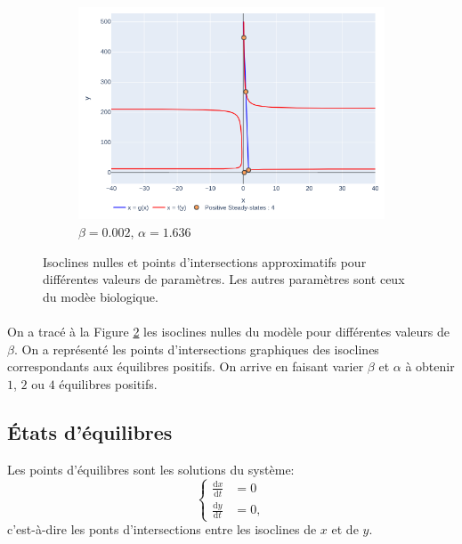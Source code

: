 \documentclass[12pt]{article}
\newcommand{\deriv}{\mathrm{d}}
\newcommand{\dt}[1]{\frac{\deriv #1}{\deriv t}}
\begin{document}
\begin{figure}[!ht]
\begin{subfigure}[b]{0.49\textwidth}
         \centering
         \includegraphics[width=\textwidth]{../figures/fig_isocline_0.png}
         \caption{$\beta = 0.002$, $\alpha=1.636$}
         \label{fig::nuclline 4 ss}
     \end{subfigure}
    \caption{Isoclines nulles et points d'intersections approximatifs pour différentes valeurs de paramètres. Les autres paramètres sont ceux du modèe biologique.}
    \label{fig:nullclines}
\end{figure}

\paragraph{}
On a tracé à la Figure \ref{fig:nullclines} les isoclines nulles du modèle pour différentes valeurs de $\beta$. On a représenté les points d'intersections graphiques des isoclines correspondants aux équilibres positifs. On arrive en faisant varier $\beta$ et $\alpha$ à obtenir $1$, $2$ ou $4$ équilibres positifs. 

\subsection{États d'équilibres}
Les points d'équilibres sont les solutions du système: 
\begin{equation*}
    \left\{
    \begin{aligned}
        \dt{x} &= 0\\
        \dt{y} &= 0,
    \end{aligned}\right.
\end{equation*}
c'est-à-dire les ponts d'intersections entre les isoclines de $x$ et de $y$. 
\end{document}
